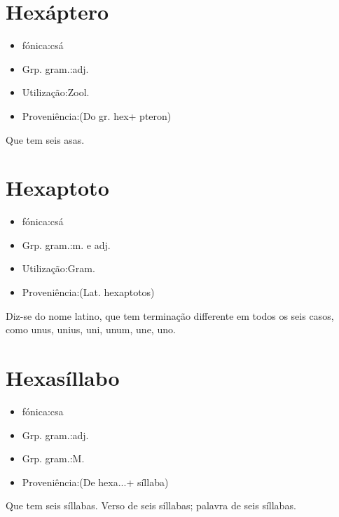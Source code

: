 \documentclass{article}
\begin{document}
\section{Hexáptero}
\begin{itemize}
\item {fónica:csá}
\end{itemize}
\begin{itemize}
\item {Grp. gram.:adj.}
\end{itemize}
\begin{itemize}
\item {Utilização:Zool.}
\end{itemize}
\begin{itemize}
\item {Proveniência:(Do gr. \textunderscore hex\textunderscore  + \textunderscore pteron\textunderscore )}
\end{itemize}
Que tem seis asas.
\section{Hexaptoto}
\begin{itemize}
\item {fónica:csá}
\end{itemize}
\begin{itemize}
\item {Grp. gram.:m.  e  adj.}
\end{itemize}
\begin{itemize}
\item {Utilização:Gram.}
\end{itemize}
\begin{itemize}
\item {Proveniência:(Lat. \textunderscore hexaptotos\textunderscore )}
\end{itemize}
Diz-se do nome latino, que tem terminação differente em todos os seis casos, como \textunderscore unus\textunderscore , \textunderscore unius\textunderscore , \textunderscore uni\textunderscore , \textunderscore unum\textunderscore , \textunderscore une\textunderscore , \textunderscore uno\textunderscore .
\section{Hexasíllabo}
\begin{itemize}
\item {fónica:csa}
\end{itemize}
\begin{itemize}
\item {Grp. gram.:adj.}
\end{itemize}
\begin{itemize}
\item {Grp. gram.:M.}
\end{itemize}
\begin{itemize}
\item {Proveniência:(De \textunderscore hexa...\textunderscore  + \textunderscore síllaba\textunderscore )}
\end{itemize}
Que tem seis síllabas.
Verso de seis síllabas; palavra de seis síllabas.
\end{document}
